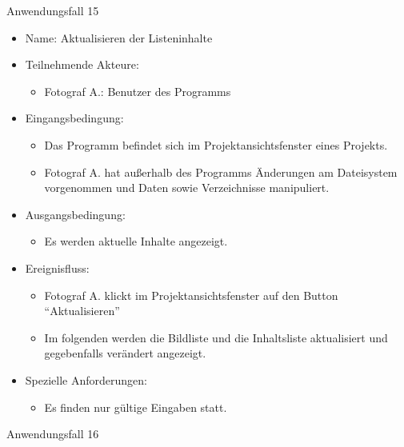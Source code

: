 	\begin{description}
		\item[Anwendungsfall 15]
	\end{description}
	
	\begin{itemize}
		\item Name: Aktualisieren der Listeninhalte
		\item Teilnehmende Akteure:
		\begin{itemize}
			\item	Fotograf A.: Benutzer des Programms		
		\end{itemize}
		\item Eingangsbedingung:
		\begin{itemize}
			\item	Das Programm befindet sich im Projektansichtsfenster eines Projekts.
			\item Fotograf A. hat außerhalb des Programms Änderungen am Dateisystem vorgenommen und Daten sowie Verzeichnisse manipuliert.
		\end{itemize}
		\item Ausgangsbedingung:
		\begin{itemize}
			\item	Es werden aktuelle Inhalte angezeigt.	
		\end{itemize}
		\item Ereignisfluss:
		\begin{itemize}
			\item Fotograf A. klickt im Projektansichtsfenster auf den Button "`Aktualisieren"'
			\item Im folgenden werden die Bildliste und die Inhaltsliste aktualisiert und gegebenfalls verändert angezeigt.
		\end{itemize}
		\item Spezielle Anforderungen:
		\begin{itemize}
			\item	Es finden nur gültige Eingaben statt.
		\end{itemize}			
	\end{itemize}
	
	\begin{description}
		\item[Anwendungsfall 16]
	\end{description}
	
